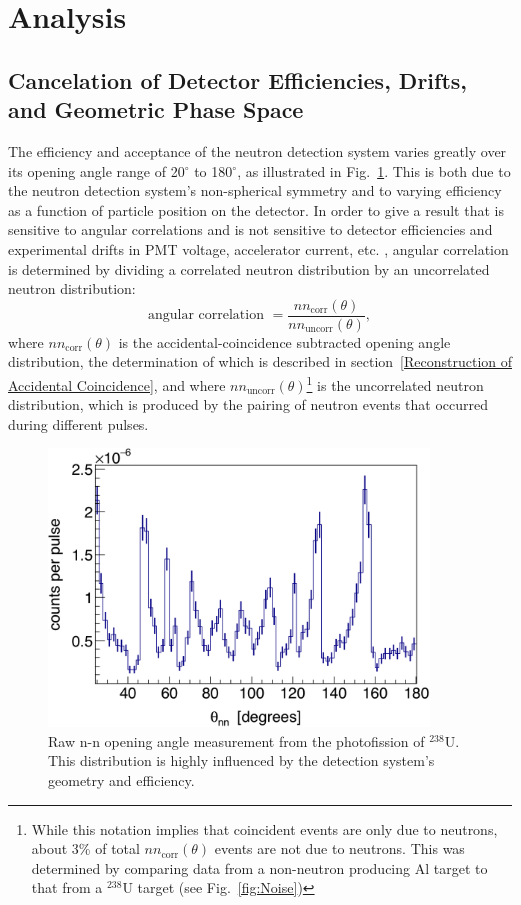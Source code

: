 \section{Analysis}
\label{Analysis}

\subsection{Cancelation of Detector Efficiencies, Drifts, and Geometric Phase Space}
\label{subsec:SPDPCancelation}
The efficiency and acceptance of the neutron detection system varies greatly over its opening angle range of 20$^{\circ}$ to 180$^{\circ}$, as illustrated in Fig.~\ref{fig:DetAcceptance}.
This is both due to the neutron detection system's non-spherical symmetry and to varying efficiency as a function of particle position on the detector.
In order to give a result that is sensitive to angular correlations and is not sensitive to detector efficiencies and experimental drifts in PMT voltage, accelerator current, etc. , angular correlation is determined by dividing a correlated neutron distribution by an uncorrelated neutron distribution:
\begin{equation}
\label{eq:angularCorr}
\text{angular correlation }  = \frac{nn_{\text{corr}}(\theta)}{nn_{\text{uncorr}}(\theta)},
\end{equation}
where $nn_{\text{corr}}(\theta)$ is the accidental-coincidence subtracted opening angle distribution, the determination of which is described in section~\ref{Reconstruction of Accidental Coincidence}, and where $nn_{\text{uncorr}}(\theta)$\footnote{While this notation implies that coincident events are only due to neutrons, about 3\% of total  $nn_{\text{corr}}(\theta)$ events are not due to neutrons. This was determined by comparing data from a non-neutron producing Al target to that from a $^{238}$U target (see Fig.~\ref{fig:Noise})} is the uncorrelated neutron distribution, which is produced by the pairing of neutron events that occurred during different pulses.
\begin{figure}[h]
\includegraphics[width=0.9\textwidth]{Content/Methods/DetAcceptance.png}
\caption{Raw n-n opening angle measurement from the photofission of $^{238}$U. 
This distribution is highly influenced by the detection system's geometry and efficiency.
}
\label{fig:DetAcceptance}
\end{figure}

